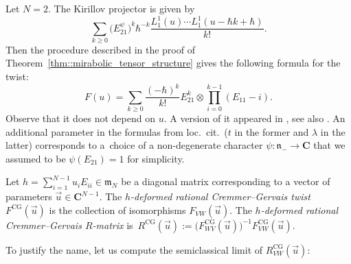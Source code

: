 \documentclass[10pt,a4paper]{amsart}
\numberwithin{equation}{section}
\newcommand{\CG}{\mathrm{CG}}
\newcommand{\C}{\mathbf{C}}
\newcommand{\n}{\mathfrak{n}}
\newcommand{\m}{\mathfrak{m}}
\begin{document}
	\begin{Example}
		Let $N=2$. The Kirillov projector is given by
		\[
		\sum\limits_{k\geq 0} \bigl(E_{21}^{\psi}\bigr)^k \hbar^{-k} \frac{L_1^1(u) \cdots L_1^1(u-\hbar k + \hbar)}{k!}.
		\]
		Then the procedure described in the proof of Theorem~\ref{thm::mirabolic_tensor_structure} gives the following formula for the twist:
		\begin{equation}
			\label{eq::cg_twist_gl2}
			F(u)= \sum\limits_{k\geq 0} \frac{(-\hbar)^k}{k!} E_{21}^k \otimes \prod_{i=0}^{k-1} (E_{11} - i).
		\end{equation}
		Observe that it does not depend on $u$. A version of it appeared in \cite{GerstenhaberGiaquintoSchack}, see also \cite{KhoroshkinStolinTolstoy}. An additional parameter in the formulas from loc.\ cit.\  ($t$ in the former and $\lambda$ in the latter) corresponds to a~choice of a non-degenerate character $\psi\colon \n_- \rightarrow \C$ that we assumed to be $\psi(E_{21})=1$ for simplicity.
	\end{Example}
	
	\begin{Definition}
		\label{def::cremmer_gervais}
		Let $h = \sum_{i=1}^{N-1} u_i E_{ii} \in \m_N$ be a diagonal matrix corresponding to a vector of parameters $\vec{u} \in \C^{N-1}$. The $h$\emph{-deformed rational Cremmer--Gervais twist} $F^{\CG}(\vec{u})$ is the collection of isomorphisms $F_{VW}(\vec{u})$. The $h$\emph{-deformed rational Cremmer--Gervais $R$-matrix} is~$R^{\CG}(\vec{u}):= \bigl(F_{WV}^{\CG}(\vec{u})\bigr)^{-1} F_{VW}^{\CG}(\vec{u})$.
	\end{Definition}
	
	To justify the name, let us compute the semiclassical limit of $R_{VW}^{\CG}(\vec{u})$:
\end{document}
